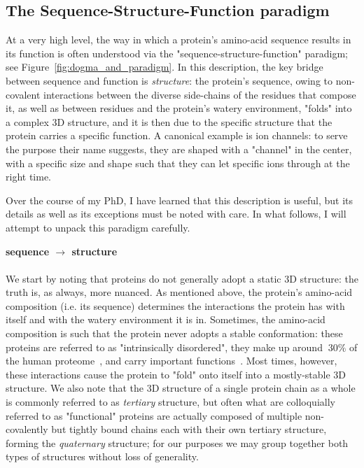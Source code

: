 \subsection{The Sequence-Structure-Function paradigm}

At a very high level, the way in which a protein's amino-acid sequence results in its function is often understood
via the "sequence-structure-function" paradigm; see Figure~\ref{fig:dogma_and_paradigm}.
In this description, the key bridge between sequence and function is \textit{structure}:
the protein's sequence, owing to non-covalent interactions between the diverse side-chains of the residues that compose it,
as well as between residues and the protein's watery environment, "folds" into a complex 3D structure,
and it is then due to the specific structure that the protein carries a specific function.
A canonical example is ion channels: to serve the purpose their name suggests,
they are shaped with a "channel" in the center, with a specific size and shape such that
they can let specific ions through at the right time.

Over the course of my PhD, I have learned that this description is useful, but its details as well as its exceptions must
be noted with care. In what follows, I will attempt to unpack this paradigm carefully.


\textbf{sequence $\to$ structure}\\
\\
We start by noting that proteins do not generally adopt a static 3D structure: the truth is, as always, more nuanced.
As mentioned above, the protein's amino-acid composition (i.e. its sequence) determines the interactions
the protein has with itself and with the watery environment it is in.
Sometimes, the amino-acid composition is such that the protein never adopts a stable conformation: these proteins
are referred to as "intrinsically disordered", they make up around $~30\%$ of the human proteome~\citep{ward_prediction_2004},
and carry important functions~\citep{deiana_intrinsically_2019}.
Most times, however, these interactions cause the protein to "fold" onto itself into a mostly-stable 3D structure.
We also note that the 3D structure of a single protein chain as a whole is commonly referred to as \textit{tertiary} structure,
but often what are colloquially referred to as "functional" proteins are actually composed of multiple non-covalently but tightly bound
chains each with their own tertiary structure, forming the \textit{quaternary} structure;
for our purposes we may group together both types of structures without loss of generality.

